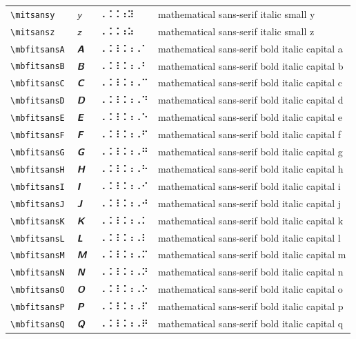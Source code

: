 \documentclass[oneside]{article}
\begin{document}
\begin{longtable}{llll}
\verb|\mitsansy| & $\mitsansy$ &  ⠠⠨⠨⠰⠽  & {mathematical sans-serif italic small y} \\[2ex]
\verb|\mitsansz| & $\mitsansz$ &  ⠠⠨⠨⠰⠵  & {mathematical sans-serif italic small z} \\[2ex]
\verb|\mbfitsansA| & $\mbfitsansA$ &  ⠠⠨⠸⠨⠰⠠⠁  & {mathematical sans-serif bold italic capital a} \\[2ex]
\verb|\mbfitsansB| & $\mbfitsansB$ &  ⠠⠨⠸⠨⠰⠠⠃  & {mathematical sans-serif bold italic capital b} \\[2ex]
\verb|\mbfitsansC| & $\mbfitsansC$ &  ⠠⠨⠸⠨⠰⠠⠉  & {mathematical sans-serif bold italic capital c} \\[2ex]
\verb|\mbfitsansD| & $\mbfitsansD$ &  ⠠⠨⠸⠨⠰⠠⠙  & {mathematical sans-serif bold italic capital d} \\[2ex]
\verb|\mbfitsansE| & $\mbfitsansE$ &  ⠠⠨⠸⠨⠰⠠⠑  & {mathematical sans-serif bold italic capital e} \\[2ex]
\verb|\mbfitsansF| & $\mbfitsansF$ &  ⠠⠨⠸⠨⠰⠠⠋  & {mathematical sans-serif bold italic capital f} \\[2ex]
\verb|\mbfitsansG| & $\mbfitsansG$ &  ⠠⠨⠸⠨⠰⠠⠛  & {mathematical sans-serif bold italic capital g} \\[2ex]
\verb|\mbfitsansH| & $\mbfitsansH$ &  ⠠⠨⠸⠨⠰⠠⠓  & {mathematical sans-serif bold italic capital h} \\[2ex]
\verb|\mbfitsansI| & $\mbfitsansI$ &  ⠠⠨⠸⠨⠰⠠⠊  & {mathematical sans-serif bold italic capital i} \\[2ex]
\verb|\mbfitsansJ| & $\mbfitsansJ$ &  ⠠⠨⠸⠨⠰⠠⠚  & {mathematical sans-serif bold italic capital j} \\[2ex]
\verb|\mbfitsansK| & $\mbfitsansK$ &  ⠠⠨⠸⠨⠰⠠⠅  & {mathematical sans-serif bold italic capital k} \\[2ex]
\verb|\mbfitsansL| & $\mbfitsansL$ &  ⠠⠨⠸⠨⠰⠠⠇  & {mathematical sans-serif bold italic capital l} \\[2ex]
\verb|\mbfitsansM| & $\mbfitsansM$ &  ⠠⠨⠸⠨⠰⠠⠍  & {mathematical sans-serif bold italic capital m} \\[2ex]
\verb|\mbfitsansN| & $\mbfitsansN$ &  ⠠⠨⠸⠨⠰⠠⠝  & {mathematical sans-serif bold italic capital n} \\[2ex]
\verb|\mbfitsansO| & $\mbfitsansO$ &  ⠠⠨⠸⠨⠰⠠⠕  & {mathematical sans-serif bold italic capital o} \\[2ex]
\verb|\mbfitsansP| & $\mbfitsansP$ &  ⠠⠨⠸⠨⠰⠠⠏  & {mathematical sans-serif bold italic capital p} \\[2ex]
\verb|\mbfitsansQ| & $\mbfitsansQ$ &  ⠠⠨⠸⠨⠰⠠⠟  & {mathematical sans-serif bold italic capital q} \\[2ex]

\end{longtable}
\end{document}
